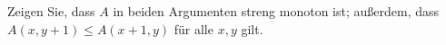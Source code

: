 
\begin{exercise}[208]

Zeigen Sie, dass $A$ in beiden Argumenten streng monoton ist; außerdem, dass
$A(x,y+1) \leq A(x+1,y)$ für alle $x,y$ gilt.

\end{exercise}


\begin{solution}

\phantom{}

\end{solution}
